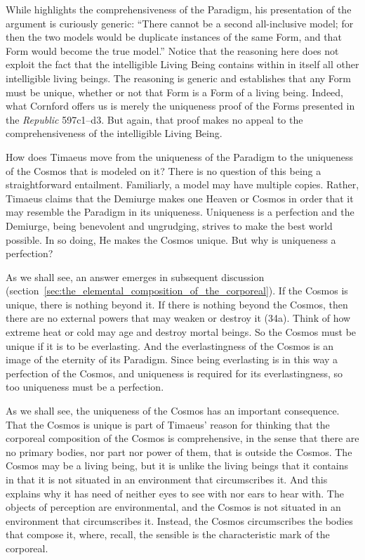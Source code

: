 While \citet[42--3]{Cornford:1935fk} highlights the comprehensiveness of the Paradigm, his presentation of the argument is curiously generic: ``There cannot be a second all-inclusive model; for then the two models would be duplicate instances of the same Form, and that Form would become the true model.'' Notice that the reasoning here does not exploit the fact that the intelligible Living Being contains within in itself all other intelligible living beings. The reasoning is generic and establishes that any Form must be unique, whether or not that Form is a Form of a living being. Indeed, what Cornford offers us is merely the uniqueness proof of the Forms presented in the \emph{Republic} 597c1--d3. But again, that proof makes no appeal to the comprehensiveness of the intelligible Living Being.

How does Timaeus move from the uniqueness of the Paradigm to the uniqueness of the Cosmos that is modeled on it? There is no question of this being a straightforward entailment. Familiarly, a model may have multiple copies. Rather, Timaeus claims that the Demiurge makes one Heaven or Cosmos in order that it may resemble the Paradigm in its uniqueness. Uniqueness is a perfection and the Demiurge, being benevolent and ungrudging, strives to make the best world possible. In so doing, He makes the Cosmos unique. But why is uniqueness a perfection?

As we shall see, an answer emerges in subsequent discussion (section~\ref{sec:the_elemental_composition_of_the_corporeal}). If the Cosmos is unique, there is nothing beyond it. If there is nothing beyond the Cosmos, then there are no external powers that may weaken or destroy it (34a). Think of how extreme heat or cold may age and destroy mortal beings. So the Cosmos must be unique if it is to be everlasting. And the everlastingness of the Cosmos is an image of the eternity of its Paradigm. Since being everlasting is in this way a perfection of the Cosmos, and uniqueness is required for its everlastingness, so too uniqueness must be a perfection.

As we shall see, the uniqueness of the Cosmos has an important consequence. That the Cosmos is unique is part of Timaeus' reason for thinking that the corporeal composition of the Cosmos is comprehensive, in the sense that there are no primary bodies, nor part nor power of them, that is outside the Cosmos. The Cosmos may be a living being, but it is unlike the living beings that it contains in that it is not situated in an environment that circumscribes it. And this explains why it has need of neither eyes to see with nor ears to hear with. The objects of perception are environmental, and the Cosmos is not situated in an environment that circumscribes it. Instead, the Cosmos circumscribes the bodies that compose it, where, recall, the sensible is the characteristic mark of the corporeal.

